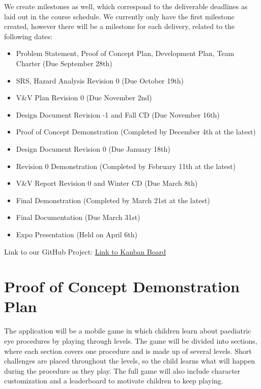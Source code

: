 \documentclass{article}
\begin{document}
We create milestones as well, which correspond to the deliverable deadlines as laid out in the course schedule.
We currently only have the first milestone created, however there will be a milestone for each delivery, related to the following dates:

{\setlength{\leftmargini}{4em}
\begin{itemize}
  \item[\textbf{M1:}] Problem Statement, Proof of Concept Plan, Development Plan, Team Charter (Due September 28th)
  \item[\textbf{M2:}] SRS, Hazard Analysis Revision 0 (Due October 19th)
  \item[\textbf{M3:}] V\&V Plan Revision 0 (Due November 2nd)
  \item[\textbf{M4:}] Design Document Revision -1 and Fall CD (Due November 16th)
  \item[\textbf{M5:}] Proof of Concept Demonstration (Completed by December 4th at the latest)
  \item[\textbf{M6:}] Design Document Revision 0 (Due January 18th)
  \item[\textbf{M7:}] Revision 0 Demonstration (Completed by February 11th at the latest)
  \item[\textbf{M8:}] V\&V Report Revision 0 and Winter CD (Due March 8th)
  \item[\textbf{M9:}] Final Demonstration (Completed by March 21st at the latest)
  \item[\textbf{M10:}] Final Documentation (Due March 31st)
  \item[\textbf{M11:}] Expo Presentation (Held on April 6th)
\end{itemize}
}

Link to our GitHub Project: \href{https://github.com/orgs/team-hindsight/projects/1/views/2}{Link to Kanban Board}

\section{Proof of Concept Demonstration Plan}

The application will be a mobile game in which children learn about paediatric
eye procedures by playing through levels. The game will be divided into
sections, where each section covers one procedure and is made up of several
levels. Short challenges are placed throughout the levels, so the child learns
what will happen during the procedure as they play. The full game will also
include character customization and a leaderboard to motivate children to keep
playing.
\end{document}
